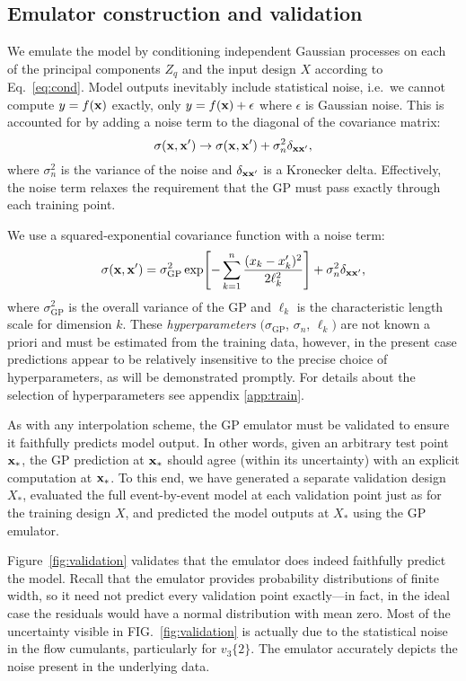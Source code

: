 \documentclass[aps,prc,reprint,superscriptaddress,amsmath]{revtex4-1}
\newcommand{\vnk}[2]{v_#1\{#2\}}
\begin{document}
\subsection{Emulator construction and validation}

We emulate the model by conditioning independent Gaussian processes on each of the principal components $Z_q$ and the input design $X$ according to Eq.~\eqref{eq:cond}.
Model outputs inevitably include statistical noise, i.e.\ we cannot compute $y = f(\mathbf x)$ exactly, only $y = f(\mathbf x) + \epsilon$ where $\epsilon$ is Gaussian noise.
This is accounted for by adding a noise term to the diagonal of the covariance matrix:
\begin{equation*}
  \sigma(\mathbf x, \mathbf x') \rightarrow \sigma(\mathbf x, \mathbf x') + \sigma^2_n\delta_{\mathbf x\mathbf x'},
\end{equation*}
where $\sigma^2_n$ is the variance of the noise and $\delta_{\mathbf x\mathbf x'}$ is a Kronecker delta.
Effectively, the noise term relaxes the requirement that the GP must pass exactly through each training point.

We use a squared-exponential covariance function with a noise term:
\begin{equation}
  \sigma(\mathbf x, \mathbf x') = \sigma_\text{GP}^2 \exp\Biggl[ -\sum_{k=1}^n \frac{(x_k - x'_k)^2}{2\ell_k^2} \Biggr] + \sigma_n^2\delta_{\mathbf x\mathbf x'},
  \label{eq:full_cov}
\end{equation}
where $\sigma_\text{GP}^2$ is the overall variance of the GP and $\ell_k$ is the characteristic length scale for dimension $k$.
These \emph{hyperparameters} $(\sigma_\text{GP}$, $\sigma_n$, $\ell_k)$ are not known a priori and must be estimated from the training data, however, in the present case predictions appear to be relatively insensitive to the precise choice of hyperparameters, as will be demonstrated promptly.
For details about the selection of hyperparameters see appendix \ref{app:train}.

As with any interpolation scheme, the GP emulator must be validated to ensure it faithfully predicts model output.
In other words, given an arbitrary test point $\mathbf x_*$, the GP prediction at $\mathbf x_*$ should agree (within its uncertainty) with an explicit computation at $\mathbf x_*$.
To this end, we have generated a separate validation design $X_*$, evaluated the full event-by-event model at each validation point just as for the training design $X$, and predicted the model outputs at $X_*$ using the GP emulator.

Figure~\ref{fig:validation} validates that the emulator does indeed faithfully predict the model.
Recall that the emulator provides probability distributions of finite width, so it need not predict every validation point exactly---in fact, in the ideal case the residuals would have a normal distribution with mean zero.
Most of the uncertainty visible in FIG.~\ref{fig:validation} is actually due to the statistical noise in the flow cumulants, particularly for $\vnk 3 2$.
The emulator accurately depicts the noise present in the underlying data.
\end{document}
